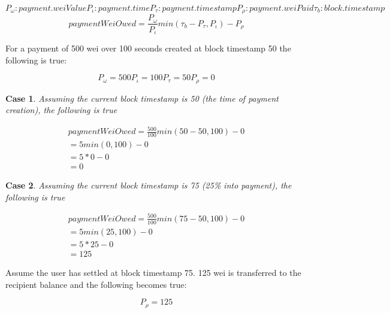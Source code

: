 \documentclass[12pt]{article}
\newtheorem{case}{Case}
\begin{document}
\[

    P_\omega: payment.weiValue

    P_\iota: payment.time

    P_\tau: payment.timestamp

    P_\rho: payment.weiPaid

    \tau_b: block.timestamp
\]
\[
    paymentWeiOwed = \frac{P_\omega}{P_\iota}min(\tau_b-P_\tau, P_\iota)-P_\rho
\]

For a payment of 500 wei over 100 seconds created at block timestamp 50 the following is true:

\[

P_\omega = 500

P_\iota = 100

P_\tau = 50

P_\rho = 0

\]

\begin{case}

Assuming the current block timestamp is 50 (the time of payment creation), the following is true

\end{case}

\begin{align*}
    paymentWeiOwed = \frac{500}{100}min(50 - 50, 100)-0 \\
                   = 5min(0, 100) - 0 \\
                   = 5 * 0 - 0 \\
                   = 0
\end{align*}

\begin{case}

Assuming the current block timestamp is 75 (25\% into payment), the following is true

\end{case}

\begin{align*}
    paymentWeiOwed = \frac{500}{100}min(75 - 50, 100) - 0 \\
                   = 5min(25, 100) - 0 \\
                   = 5 * 25 - 0 \\
                   = 125
\end{align*}

Assume the user has settled at block timestamp 75. 125 wei is transferred to the recipient balance and the following becomes true:

\[
P_\rho = 125
\]
\end{document}
